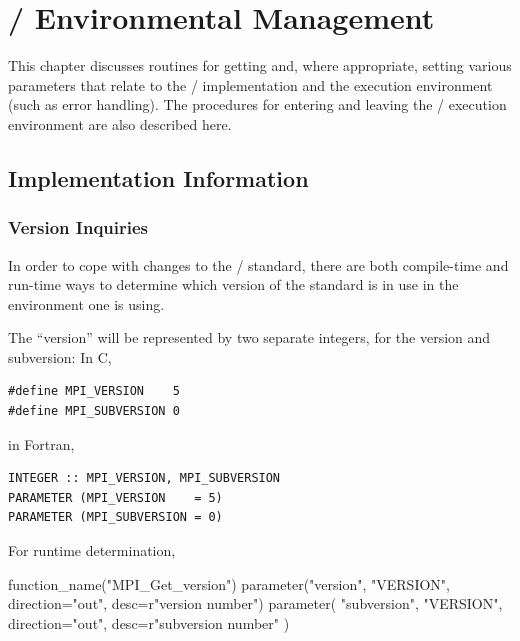 \chapter{\texorpdfstring{\MPI/}{MPI} Environmental Management}
\label{sec:environment}
\label{chap:environment}

This chapter discusses routines for getting and, where appropriate, setting
various parameters that relate to the \MPI/ implementation and the execution environment
(such as error handling).
The procedures for entering and leaving the \MPI/ execution environment are also
described here.

\section{Implementation Information}
\label{sec:inquiry-impl}

\subsection{Version Inquiries}
\label{subsec:inquiry-version}
In order to cope with changes to the \MPI/ standard, there are both compile-time
and run-time ways to determine which version of the standard is in use in the
environment one is using.

The ``version'' will be represented by two separate integers, for the version
and subversion: In C,
\begin{lstlisting}[language={[MPI]C}]
#define MPI_VERSION    5
#define MPI_SUBVERSION 0
\end{lstlisting}
in Fortran,
\begin{lstlisting}[language={[MPI]Fortran}]
INTEGER :: MPI_VERSION, MPI_SUBVERSION
PARAMETER (MPI_VERSION    = 5)
PARAMETER (MPI_SUBVERSION = 0)
\end{lstlisting}
\noindent

For runtime determination,

\begin{mpi-binding}
    function_name("MPI_Get_version")
    parameter("version", "VERSION", direction="out", desc=r"version number")
    parameter(
        "subversion", "VERSION", direction="out", desc=r"subversion number"
    )
\end{mpi-binding}

